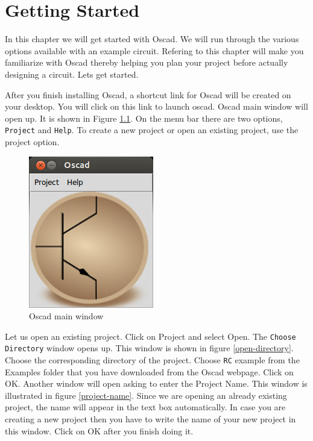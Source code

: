 
\chapter {Getting Started}
\label{chap4}

In this chapter we will get started with Oscad. We will run through the various options available with an example circuit. Refering to this chapter will make you familiarize with Oscad thereby helping you plan your project before actually designing a circuit. Lets get started.

After you finish installing Oscad, a shortcut link for Oscad will be created on your desktop. You will click on this link to launch oscad. Oscad main window will open up. It is shown in Figure \ref{main-window}. On the menu bar there are two options, {\tt Project} and {\tt Help}. To create a new project or open an existing project, use the project option.

\begin{figure}
\begin{center}
\includegraphics[width=0.5\linewidth]{figures/main-window.png}
\caption{Oscad main window}
\label{main-window}
\end{center}
\end{figure}

Let us open an existing project. Click on Project and select Open. The {\tt Choose Directory} window opens up. This window is shown in figure \ref{open-directory}. Choose the corresponding directory of the project. Choose {\tt RC} example from the Examples folder that you have downloaded from the Oscad webpage. Click on OK. Another window will open asking to enter the Project Name. This window is illustrated in figure \ref{project-name}. Since we are opening an already existing project, the name will appear in the text box automatically. In case you are creating a new project then you have to write the name of your new project in this window. Click on OK after you finish doing it.

